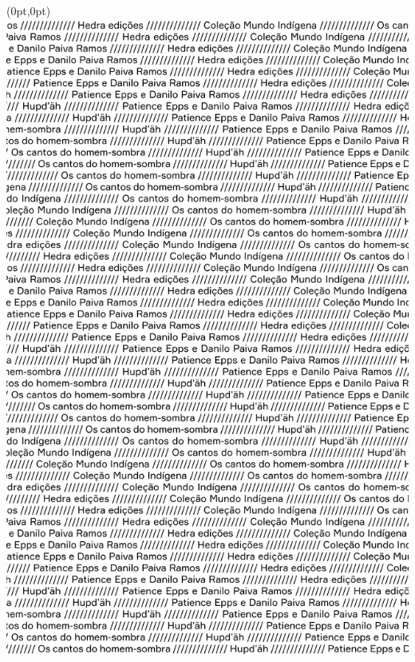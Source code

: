 \thispagestyle{empty}
\begin{textblock*}{2.625in}(0pt,0pt)%
\vspace*{-2.4cm}
\hspace*{-2.3cm}\includegraphics[width=138mm]{./MI_PAIVA_EPPS_SOMBRA_ABERTURA.png}  
\end{textblock*}
\clearpage

\thispagestyle{empty}




